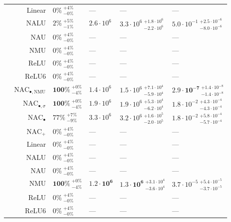 \begin{longtable}{crllll}
\nopagebreak
 & Linear & $0\% {~}^{+4\%}_{-0\%}$ & --- & --- & ---\\

\nopagebreak
 & NALU & $2\% {~}^{+5\%}_{-1\%}$ & $2.6 \cdot 10^{6}$ & $3.3 \cdot 10^{6} {~}^{+1.8 \cdot 10^{6}}_{-2.2 \cdot 10^{6}}$ & $5.0 \cdot 10^{-1} {~}^{+2.5 \cdot 10^{-6}}_{-8.0 \cdot 10^{-6}}$\\

\nopagebreak
 & NAU & $0\% {~}^{+4\%}_{-0\%}$ & --- & --- & ---\\

\nopagebreak
 & NMU & $0\% {~}^{+4\%}_{-0\%}$ & --- & --- & ---\\

\nopagebreak
 & ReLU & $0\% {~}^{+4\%}_{-0\%}$ & --- & --- & ---\\

\nopagebreak
\multirow{-10}{*}{\centering\arraybackslash $\sqrt{z}$} & ReLU6 & $0\% {~}^{+4\%}_{-0\%}$ & --- & --- & ---\\
\cmidrule{1-6}
 & $\mathrm{NAC}_{\bullet,\mathrm{NMU}}$ & $\mathbf{100\%} {~}^{+0\%}_{-4\%}$ & $1.4 \cdot 10^{6}$ & $1.5 \cdot 10^{6} {~}^{+7.1 \cdot 10^{4}}_{-5.9 \cdot 10^{4}}$ & $\mathbf{2.9 \cdot 10^{-7}} {~}^{+1.4 \cdot 10^{-8}}_{-1.4 \cdot 10^{-8}}$\\

\nopagebreak
 & $\mathrm{NAC}_{\bullet,\sigma}$ & $\mathbf{100\%} {~}^{+0\%}_{-4\%}$ & $1.9 \cdot 10^{6}$ & $1.9 \cdot 10^{6} {~}^{+5.3 \cdot 10^{4}}_{-6.2 \cdot 10^{4}}$ & $1.8 \cdot 10^{-2} {~}^{+4.3 \cdot 10^{-4}}_{-4.3 \cdot 10^{-4}}$\\

\nopagebreak
 & $\mathrm{NAC}_{\bullet}$ & $77\% {~}^{+7\%}_{-9\%}$ & $3.3 \cdot 10^{6}$ & $3.2 \cdot 10^{6} {~}^{+1.6 \cdot 10^{5}}_{-2.0 \cdot 10^{5}}$ & $1.8 \cdot 10^{-2} {~}^{+5.8 \cdot 10^{-4}}_{-5.7 \cdot 10^{-4}}$\\

\nopagebreak
 & $\mathrm{NAC}_{+}$ & $0\% {~}^{+4\%}_{-0\%}$ & --- & --- & ---\\

\nopagebreak
 & Linear & $0\% {~}^{+4\%}_{-0\%}$ & --- & --- & ---\\

\nopagebreak
 & NALU & $0\% {~}^{+4\%}_{-0\%}$ & --- & --- & ---\\

\nopagebreak
 & NAU & $0\% {~}^{+4\%}_{-0\%}$ & --- & --- & ---\\

\nopagebreak
 & NMU & $\mathbf{100\%} {~}^{+0\%}_{-4\%}$ & $\mathbf{1.2 \cdot 10^{6}}$ & $\mathbf{1.3 \cdot 10^{6}} {~}^{+3.1 \cdot 10^{4}}_{-3.6 \cdot 10^{4}}$ & $3.7 \cdot 10^{-5} {~}^{+5.4 \cdot 10^{-5}}_{-3.7 \cdot 10^{-5}}$\\

\nopagebreak
 & ReLU & $0\% {~}^{+4\%}_{-0\%}$ & --- & --- & ---\\

\nopagebreak
\multirow{-10}{*}{\centering\arraybackslash $z^2$} & ReLU6 & $0\% {~}^{+4\%}_{-0\%}$ & --- & --- & ---\\*
\end{longtable}
